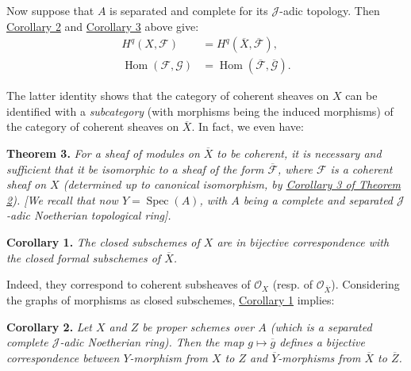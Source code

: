 \documentclass{article}
\newenvironment{itenv}[1]
  {\phantomsection\par\smallskip\noindent\textbf{#1.}\itshape}
  {\par\smallskip}
\newcommand{\oldpage}[1]{\marginpar{\footnotesize$\Big\vert$ \textit{p.~#1}}}
\theoremstyle{definition}
\theoremstyle{definition}
\theoremstyle{definition}
\theoremstyle{definition}
\theoremstyle{remark}
\begin{document}
Now suppose that \(A\) is separated and complete for its \({\mathscr{J}}\)-adic topology.
Then \protect\hyperlink{fga-2-theorem-2-corollary-2}{Corollary 2} and \protect\hyperlink{fga-2-theorem-2-corollary-3}{Corollary 3} above give:
\[
  \begin{aligned}
    H^q(X,{\mathscr{F}}) &= H^q(\overline{X},\overline{{\mathscr{F}}}),
  \\\operatorname{Hom}({\mathscr{F}},{\mathscr{G}}) &= \operatorname{Hom}(\overline{{\mathscr{F}}},\overline{{\mathscr{G}}}).
  \end{aligned}
\]

\oldpage{182-06}The latter identity shows that the category of coherent sheaves on \(X\) can be identified with a \emph{subcategory} (with morphisms being the induced morphisms) of the category of coherent sheaves on \(\overline{X}\).
In fact, we even have:

\leavevmode{}%
\begin{itenv}{Theorem 3}
For a sheaf of modules on \(\overline{X}\) to be coherent, it is necessary and sufficient that it be isomorphic to a sheaf of the form \(\overline{{\mathscr{F}}}\), where \({\mathscr{F}}\) is a coherent sheaf on \(X\) (determined up to canonical isomorphism, by \protect\hyperlink{fga-2-theorem-2-corollary-3}{Corollary 3 of Theorem 2}).
{[}We recall that now \(Y=\operatorname{Spec}(A)\), with \(A\) being a complete and separated \({\mathscr{J}}\)-adic Noetherian topological ring{]}.

\end{itenv}

\leavevmode{}%
\begin{itenv}{Corollary 1}
The closed subschemes of \(X\) are in bijective correspondence with the closed formal subschemes of \(\overline{X}\).

\end{itenv}

Indeed, they correspond to coherent subsheaves of \({\mathscr{O}}_X\) (resp. of \({\mathscr{O}}_{\overline{X}}\)).
Considering the graphs of morphisms as closed subschemes, \protect\hyperlink{fga-2-theorem-3-corollary-1}{Corollary 1} implies:

\leavevmode{}%
\begin{itenv}{Corollary 2}
Let \(X\) and \(Z\) be proper schemes over \(A\) (which is a separated complete \({\mathscr{J}}\)-adic Noetherian ring).
Then the map \(g\mapsto\overline{g}\) defines a bijective correspondence between \(Y\)-morphism from \(X\) to \(Z\) and \(\overline{Y}\)-morphisms from \(\overline{X}\) to \(\overline{Z}\).

\end{itenv}
\end{document}
